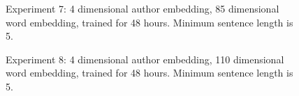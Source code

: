 \documentclass{article}%
\begin{document}
\begin{figure}
\noindent{}
\caption{Experiment 7: 4 dimensional author embedding, 85 dimensional word embedding, trained for 48 hours. Minimum sentence length is 5.}
\end{figure}
\begin{figure}
\noindent{}
\caption{Experiment 8: 4 dimensional author embedding, 110 dimensional word embedding, trained for 48 hours. Minimum sentence length is 5.}
\end{figure}
\end{document}
